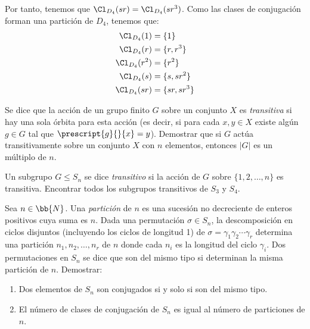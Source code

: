 \begin{ejercicio}
    Por tanto, tenemos que $\Cl_{D_4}(sr) = \Cl_{D_4}(sr^3)$. Como las clases de conjugación forman una partición de $D_4$, tenemos que:
    \begin{align*}
        \Cl_{D_4}(1) &= \{1\} \\
        \Cl_{D_4}(r) &= \{r, r^3\} \\
        \Cl_{D_4}(r^2) &= \{r^2\} \\
        \Cl_{D_4}(s) &= \{s, sr^2\} \\
        \Cl_{D_4}(sr) &= \{sr, sr^3\}
    \end{align*}
\end{ejercicio}

\begin{ejercicio}\label{ej:6.7}
    Se dice que la acción de un grupo finito $G$ sobre un conjunto $X$ es \emph{transitiva} si hay una sola órbita para esta acción (es decir, si para cada $x, y \in X$ existe algún $g \in G$ tal que $\prescript{g}{}{x} = y$). Demostrar que si $G$ actúa transitivamente sobre un conjunto $X$ con $n$ elementos, entonces $|G|$ es un múltiplo de $n$.
\end{ejercicio}

\begin{ejercicio}\label{ej:6.8}
    Un subgrupo $G \leq S_n$ se dice \emph{transitivo} si la acción de $G$ sobre $\{1, 2, \ldots, n\}$ es transitiva. Encontrar todos los subgrupos transitivos de $S_3$ y $S_4$.
\end{ejercicio}

\begin{ejercicio}\label{ej:6.9}
    Sea $n\in \bb{N}$. Una \emph{partición} de $n$ es una sucesión no decreciente de enteros positivos cuya suma es $n$. Dada una permutación $\sigma \in S_n$, la descomposición en ciclos disjuntos (incluyendo los ciclos de longitud 1) de $\sigma = \gamma_1 \gamma_2 \cdots \gamma_r$ determina una partición $n_1, n_2, \ldots, n_r$ de $n$ donde cada $n_i$ es la longitud del ciclo $\gamma_i$. Dos permutaciones en $S_n$ se dice que son del mismo tipo si determinan la misma partición de $n$. Demostrar:
    \begin{enumerate}
        \item Dos elementos de $S_n$ son conjugados si y solo si son del mismo tipo.
        \item El número de clases de conjugación de $S_n$ es igual al número de particiones de $n$.
    \end{enumerate}
\end{ejercicio}


